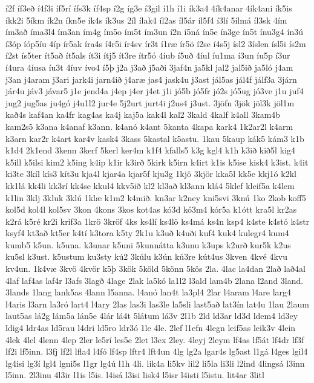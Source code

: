 {í2f
íf3eð
í4f3i
íf5rí
ífs3k
íf4sp
í2g
íg3e
í3gil
í1h
í1i
ík3a4
4ík4anar
4ík4ani
ík5is
íkk2i
5íkm
ík2n
íkn5e
ík4s
ík3us
2íl
ílak4
íl2as
íl5ár
íl5f4
í3lí
5ílmá
íl3sk
4ím
ím3að
íma3l4
ím3an
ím4g
ím5o
ím5t
ím3un
í2n
í5ná
ín5e
ín3ge
ín5t
ínu3g4
ín3ú
í3óp
íóp5íu
4íp
ír5ak
íra4s
í4r5i
ír4sv
ír3t
í1ræ
ír5ö
í2se
í4s5j
ísl2
3íslen
ísl5i
ís2m
í2st
ís5ter
ít5að
ít5als
ít3i
ítj5
ít3re
ítr5ó
4íub
í5uð
4íul
íu1ma
í3un
íu5p
í3ur
í4ura
4íusa
íu3t
4íuv
ívo4
í5þ
j2a
j3að
j5aði
3jaf4n
ja5kl
jal2
jal5ið
ja5ló
j4am
j3an
j4aram
j3ari
jark4i
jarn4ið
j4aræ
jas4
jask4u
j3ast
jál5as
jál4f
jálf3a
3járn
jár4u
jáv3
jávar5
j1e
jend4a
j4ep
j4er
j4et
j1i
jó5b
jó5fr
jó2s
jó5ug
jó3ve
j1u
juf4
jug2
jug5as
ju4gó
j4u1l2
jur4e
5j2urt
jurt4i
j2us4
j3ust.
3jöfn
3jök
jöl3k
jöl1m
kað4s
kaf4an
ka4fr
kag4as
ka4j
kaj5a
kak4l
kal2
3kald
4kalf
k4all
3kam4b
kam2s5
k3ana
k4anaf
k3ann.
k4anó
k4ant
5kanta
4kapa
kark4
1k2ar2l
k4arm
k3arn
kar2r
k4art
kar4v
kask4
3kass
5kastal
k5astu.
1kau
5kaup
kák5
kám3
k1b
k1d4
2k1end
3kenn
3kerf
5kerl
ker4m
k1f4
kfalls5
k3g
kgl4
k1h
k3ið
kið5l
kig4
k5ill
k5ilsi
kim2
k5ing
k4ip
k1ir
k3irð
5kirk
k5irn
k4irt
k1is
k5ise
kisk4
k3ist.
k4it
ki3te
3kíl
kís3
kít3u
kja4l
kjar4a
kjar5f
kju3g
1kjö
3kjör
kka5l
kk5e
kkj1ó
k2kl
kk1lá
kk4li
kk3rí
kk4se
kkul4
kkv5ið
kl2
kl3að
kl3ann
klá4
5klef
kleif5a
k4lem
k1lin
3klj
3kluk
3klú
1klæ
k1m2
k4mið.
kn3ar
k2ney
kni5svi
3knú
1ko
2kob
koff5
kol5d
kol4l
kol5sv
3kon
4kons
3kos
kot4as
kó3d
kó3m4
kór5a
k1ótt
kra5l
kr2as
k2rá
k5ré
kr2i
krif3a
1krö
3kröf
4ks
ks4lí
ks4lö
ks4má
ks4n
ksp4
k4ste
k4stó
k4str
ksyf4
kt3að
kt5er
k4tí
k3tora
k5ty
2k1u
k3uð
k4uði
kuf4
kuk4
kulegr4
kum4
kumb5
k5un.
k5una.
k3unar
k5uni
5kunnátta
k3unu
k3ups
k2urð
kur5k
k2us
ku5sl
k3ust.
k5ustum
ku3sty
kú2
3kúlu
k3ún
kú3re
kút4us
3kven
4kvé
4kvu
kv4un.
1k4væ
3kvö
4kvör
k5þ
3kök
5köld
5könn
5kös
2la.
4lac
la4dan
2lað
lað4al
4laf
laf4as
laf4r
l3afs
3lagð
4lage
2lak
la5kó
la1l2
l3ald
lam4b
2lana
l2and
3land.
3lands
1lang
lank5as
4lann
l5anna.
l4anó
lan4t
la3pl4
2lar
l4aram
l4are
larg4
l4aris
l3arn
la3ró
lart4
l4ary
2las
las3i
las3le
la5sli
last5að
lat3ín
lat4u
1lau
2laum
laut5as
lá2g
lám5a
lán5e
4lár
lá4t
5látum
lá3v
2l1b
2ld
ld3ar
ld3d
ldem4
ld3ey
ldig4
ldr4as
ld5rau
l4dri
ld5ro
ldr3ó
1le
4le.
2lef
l1efn
4legn
leif5as
leik3v
4lein
4lek
4lel
4lenn
4lep
2ler
le5rí
les5e
2let
l3ex
2ley.
4leyj
2leym
lf4as
lf5át
lf4dr
lf3f
lf2i
lf5inn.
l3fj
lf2l
lfla4
l4fó
lf4sp
lftr4
lft4un
4lg
lg2a
lgar4s
lg5ast
l1gá
l4ges
lgil4
lg4isi
lg3í
lgl4
lgni5s
l1gr
lg4ú
l1h
4li.
lik4a
li5kv
lil2
li5la
li3li
l2ind
4lingsá
l3inn
l5inn.
2l3inu
4l3ir
l1is
l5is.
l4isá
l3isi
lisk4
l5isr
l4isti
l5istu.
lit4ar
3litl
}
